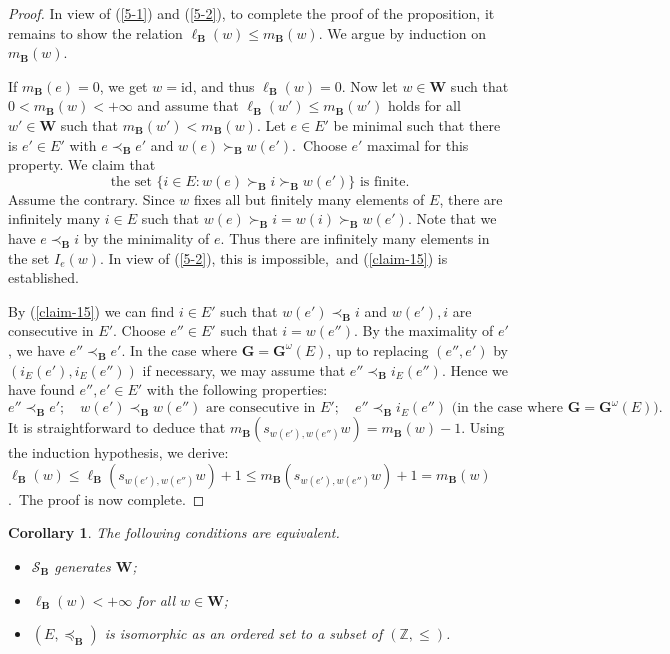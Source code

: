 \documentclass[12pt]{amsart}
\newtheorem{corollary}{Corollary}
\theoremstyle{definition}
\begin{document}
\begin{proof}
In view of (\ref{5-1}) and (\ref{5-2}), to complete the proof of the proposition, it remains to show the relation $\ell_\mathbf{B}(w)\leq m_\mathbf{B}(w)$. We argue by induction on $m_\mathbf{B}(w)$.

If $m_\mathbf{B}(e)=0$, we get $w=\mathrm{id}$, and thus $\ell_\mathbf{B}(w)=0$.
Now let $w\in\mathbf{W}$ such that $0<m_\mathbf{B}(w)<+\infty$ and assume that $\ell_\mathbf{B}(w')\leq m_\mathbf{B}(w')$ holds for all $w'\in\mathbf{W}$ such that $m_\mathbf{B}(w')<m_\mathbf{B}(w)$.
Let $e\in E'$ be minimal such that there is $e'\in E'$ with $e\prec_\mathbf{B} e'$ and $w(e)\succ_\mathbf{B}w(e')$.\ Choose $e'$ maximal for this property. We claim that
\begin{equation}
\label{claim-15}
\mbox{the set $\{i\in E:w(e)\succ_\mathbf{B}i\succ_\mathbf{B}w(e')\}$ is finite.}
\end{equation}Assume the contrary. Since $w$ fixes all but finitely many elements of $E$, there are infinitely many $i\in E$ such that $w(e)\succ_\mathbf{B}i=w(i)\succ_\mathbf{B}w(e')$.
Note that we have $e\prec_\mathbf{B}i$ by the minimality of $e$. Thus there are infinitely many elements in the set $I_e(w)$. In view of (\ref{5-2}), this is impossible,\ and (\ref{claim-15}) is established.

By (\ref{claim-15}) we can find $i\in E'$ such that $w(e')\prec_\mathbf{B}i$ and $w(e'),i$ are consecutive in $E'$. Choose $e''\in E'$ such that $i=w(e'')$. By the maximality of $e'$, we have $e''\prec_\mathbf{B}e'$. In the case where $\mathbf{G}=\mathbf{G}^\omega(E)$, up to replacing $(e'',e')$ by $(i_E(e'),i_E(e''))$ if necessary, we may assume that $e''\prec_\mathbf{B}i_E(e'')$. Hence we have found $e'',e'\in E'$ with the following properties:
\[e''\prec_\mathbf{B}e';\quad \mbox{$w(e')\prec_\mathbf{B}w(e'')$ are consecutive in $E'$};\quad e''\prec_\mathbf{B}i_E(e'')\mbox{ (in the case where $\mathbf{G}=\mathbf{G}^\omega(E)$)}.\]
It is straightforward to deduce that $m_\mathbf{B}(s_{w(e'),w(e'')}w)=m_\mathbf{B}(w)-1$.
Using the induction hypothesis, we derive: $\ell_\mathbf{B}(w)\leq \ell_\mathbf{B}(s_{w(e'),w(e'')}w)+1\leq m_\mathbf{B}(s_{w(e'),w(e'')}w)+1=m_\mathbf{B}(w)$.\ The proof is now complete.
\end{proof}

\begin{corollary}
\label{corollary-8-new}
The following conditions are equivalent.
\begin{itemize}
\item[\rm (i)] $\mathcal{S}_\mathbf{B}$ generates $\mathbf{W}$;
\item[\rm (ii)] $\ell_\mathbf{B}(w)<+\infty$ for all $w\in \mathbf{W}$;
\item[\rm (iii)] $(E,\preceq_\mathbf{B})$ is isomorphic as an ordered set to a subset of $(\mathbb{Z},\leq)$.
\end{itemize}
\end{corollary}
\end{document}
